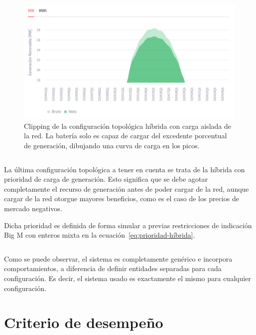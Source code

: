 \begin{figure}
  \centering
  \includegraphics[width=0.75\linewidth]{figures/clipping.png}
  \caption[Clipping de configuración topológica híbrida.]{Clipping de la configuración topológica híbrida con carga aislada de la red. La batería solo es capaz de cargar del excedente porcentual de generación, dibujando una curva de carga en los picos.}%
  \label{fig:clipping}
\end{figure}

\begin{equation}%
  \label{eq:clipping}
\end{equation}

La última configuración topológica a tener en cuenta se trata de la híbrida con prioridad de carga de generación. Esto significa que se debe agotar completamente el recurso de generación antes de poder cargar de la red, aunque cargar de la red otorgue mayores beneficios, como es el caso de los precios de mercado negativos.

Dicha prioridad es definida de forma simular a previas restricciones de indicación Big M con enteros mixta en la ecuación~\ref{eq:prioridad-híbrida}.

\begin{equation}%
  \label{eq:prioridad-híbrida}
\end{equation}

Como se puede observar, el sistema es completamente genérico e incorpora comportamientos, a diferencia de definir entidades separadas para cada configuración. Es decir, el sistema usado es exactamente el mismo para cualquier configuración.


\section{Criterio de desempeño}%
\label{makereference5.3}

